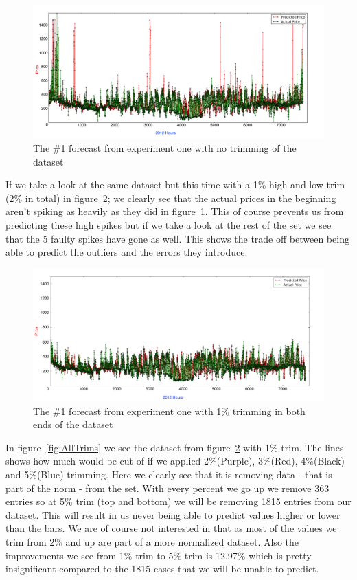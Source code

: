 \begin{figure}[H]
\centering
\includegraphics[width=\linewidth]{billeder/PriceExperimentalAnalysis/NoTrimming.png}
\caption{The \#1 forecast from experiment one with no trimming of the dataset}
\label{fig:NoTrim}
\end{figure}

If we take a look at the same dataset but this time with a 1\% high and low trim (2\% in total) in figure~\ref{fig:1PTrim}; we clearly see that the actual prices in the beginning aren't spiking as heavily as they did in figure~\ref{fig:NoTrim}. This of course prevents us from predicting these high spikes but if we take a look at the rest of the set we see that the 5 faulty spikes have gone as well. This shows the trade off between being able to predict the outliers and the errors they introduce.

\begin{figure}[H]
\centering
\includegraphics[width=\linewidth]{billeder/PriceExperimentalAnalysis/1PTrim.png}
\caption{The \#1 forecast from experiment one with 1\% trimming in both ends of the dataset}
\label{fig:1PTrim}
\end{figure}

In figure~\ref{fig:AllTrims} we see the dataset from figure~\ref{fig:1PTrim} with 1\% trim. The lines shows how much would be cut of if we applied 2\%(Purple), 3\%(Red), 4\%(Black) and 5\%(Blue) trimming. Here we clearly see that it is removing data - that is part of the norm - from the set. With every percent we go up we remove 363 entries so at 5\% trim (top and bottom) we will be removing 1815 entries from our dataset. This will result in us never being able to predict values higher or lower than the bars. We are of course not interested in that as most of the values we trim from 2\% and up are part of a more normalized dataset. Also the improvements we see from 1\% trim to 5\% trim is 12.97\% which is pretty insignificant compared to the 1815 cases that we will be unable to predict.

